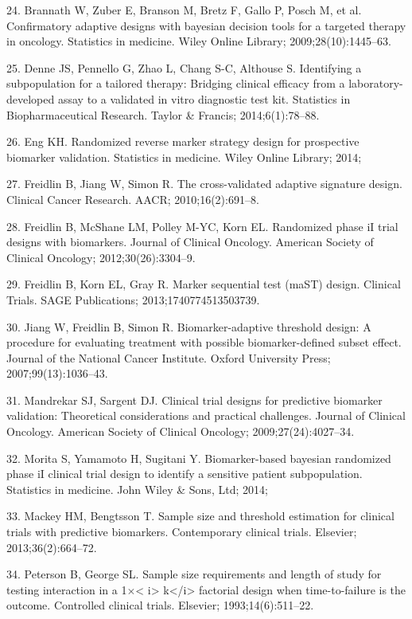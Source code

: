 \documentclass[11pt]{article}
\begin{document}
24. Brannath W, Zuber E, Branson M, Bretz F, Gallo P, Posch M, et al.
Confirmatory adaptive designs with bayesian decision tools for a
targeted therapy in oncology. Statistics in medicine. Wiley Online
Library; 2009;28(10):1445--63.

25. Denne JS, Pennello G, Zhao L, Chang S-C, Althouse S. Identifying a
subpopulation for a tailored therapy: Bridging clinical efficacy from a
laboratory-developed assay to a validated in vitro diagnostic test kit.
Statistics in Biopharmaceutical Research. Taylor \& Francis;
2014;6(1):78--88.

26. Eng KH. Randomized reverse marker strategy design for prospective
biomarker validation. Statistics in medicine. Wiley Online Library;
2014;

27. Freidlin B, Jiang W, Simon R. The cross-validated adaptive signature
design. Clinical Cancer Research. AACR; 2010;16(2):691--8.

28. Freidlin B, McShane LM, Polley M-YC, Korn EL. Randomized phase iI
trial designs with biomarkers. Journal of Clinical Oncology. American
Society of Clinical Oncology; 2012;30(26):3304--9.

29. Freidlin B, Korn EL, Gray R. Marker sequential test (maST) design.
Clinical Trials. SAGE Publications; 2013;1740774513503739.

30. Jiang W, Freidlin B, Simon R. Biomarker-adaptive threshold design: A
procedure for evaluating treatment with possible biomarker-defined
subset effect. Journal of the National Cancer Institute. Oxford
University Press; 2007;99(13):1036--43.

31. Mandrekar SJ, Sargent DJ. Clinical trial designs for predictive
biomarker validation: Theoretical considerations and practical
challenges. Journal of Clinical Oncology. American Society of Clinical
Oncology; 2009;27(24):4027--34.

32. Morita S, Yamamoto H, Sugitani Y. Biomarker-based bayesian
randomized phase iI clinical trial design to identify a sensitive
patient subpopulation. Statistics in medicine. John Wiley \& Sons, Ltd;
2014;

33. Mackey HM, Bengtsson T. Sample size and threshold estimation for
clinical trials with predictive biomarkers. Contemporary clinical
trials. Elsevier; 2013;36(2):664--72.

34. Peterson B, George SL. Sample size requirements and length of study
for testing interaction in a 1\(\times\)\textless{} i\textgreater{}
k\textless{}/i\textgreater{} factorial design when time-to-failure is
the outcome. Controlled clinical trials. Elsevier; 1993;14(6):511--22.
\end{document}
